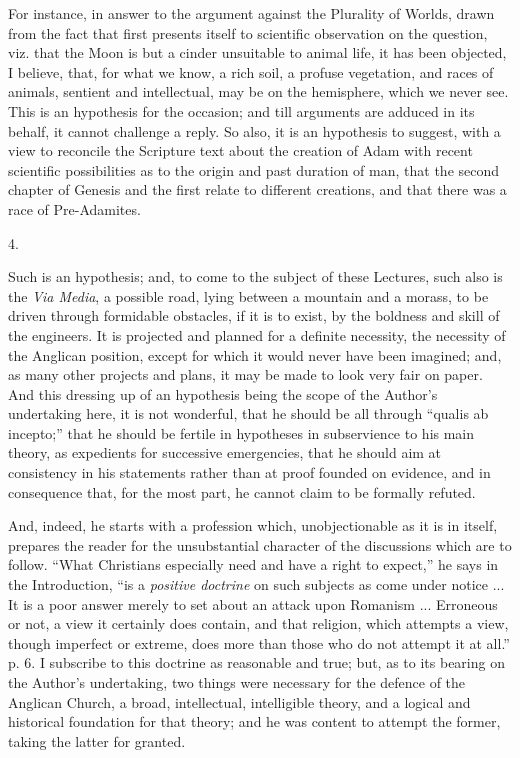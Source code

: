 For instance, in answer to the argument against the Plurality of
Worlds, drawn from the fact that first presents itself to scientific
observation on the question, viz. that the Moon is but a cinder
unsuitable to animal life, it has been objected, I believe, that, for
what we know, a rich soil, a profuse vegetation, and races of animals,
sentient and intellectual, may be on the hemisphere, which we never
see. This is an hypothesis for the occasion; and till arguments are
adduced in its behalf, it cannot challenge a reply. So also, it is an
hypothesis to suggest, with a view to reconcile the Scripture text
about the creation of Adam with recent scientific possibilities as to
the origin and past duration of man, that the second chapter of
Genesis and the first relate to different creations, and that there
was a race of Pre-Adamites.

4.

Such is an hypothesis; and, to come to the subject of these
Lectures, such also is the \emph{Via Media}, a possible road, lying
between a mountain and a morass, to be driven through formidable
obstacles, if it is to exist, by the boldness and skill of the
engineers. It is projected and planned for a definite necessity, the
necessity of the Anglican position, except for which it would never
have been imagined; and, as many other projects and plans, it may be
made to look very fair on paper. And this dressing up of an hypothesis
being the scope of the Author's undertaking here, it is not wonderful,
that he should be all through ``qualis ab incepto;'' that he
should be fertile in hypotheses in subservience to his main theory, as
expedients for successive emergencies, that he should aim at
consistency in his statements rather than at proof founded on
evidence, and in consequence that, for the most part, he cannot claim
to be formally refuted.

And, indeed, he starts with a profession which, unobjectionable as
it is in itself, prepares the reader for the unsubstantial character
of the discussions which are to follow. ``What Christians
especially need and have a right to expect,'' he says in the
Introduction, ``is a \emph{positive doctrine} on such subjects as
come under notice ... It is a poor answer merely to set about an
attack upon Romanism ... Erroneous or not, a view it certainly does
contain, and that religion, which attempts a view, though imperfect or
extreme, does more than those who do not attempt it at all.'' p.
6. I subscribe to this doctrine as reasonable and true; but, as to its
bearing on the Author's undertaking, two things were necessary for the
defence of the Anglican Church, a broad, intellectual, intelligible
theory, and a logical and historical foundation for that theory; and
he was content to attempt the former, taking the latter for granted.

